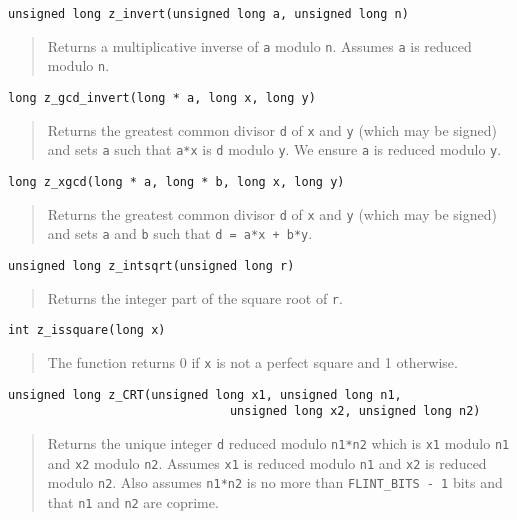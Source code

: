 \documentclass[a4paper,10pt]{article}
\newcommand{\code}{\lstinline}
\begin{document}
\begin{lstlisting}
unsigned long z_invert(unsigned long a, unsigned long n)
\end{lstlisting}
\begin{quote}
Returns a multiplicative inverse of \code{a} modulo \code{n}. Assumes \code{a} is reduced modulo \code{n}.
\end{quote}

\begin{lstlisting}
long z_gcd_invert(long * a, long x, long y)
\end{lstlisting}
\begin{quote}
Returns the greatest common divisor \code{d} of \code{x} and \code{y} (which may be signed) and sets \code{a} such that \code{a*x} is \code{d} modulo \code{y}. We ensure \code{a} is reduced modulo \code{y}.
\end{quote}

\begin{lstlisting}
long z_xgcd(long * a, long * b, long x, long y)
\end{lstlisting}
\begin{quote}
Returns the greatest common divisor \code{d} of \code{x} and \code{y} (which may be signed) and sets \code{a} and \code{b} such that \code{d = a*x + b*y}. 
\end{quote}

\begin{lstlisting}
unsigned long z_intsqrt(unsigned long r)
\end{lstlisting}
\begin{quote}
Returns the integer part of the square root of \code{r}. 
\end{quote}

\begin{lstlisting}
int z_issquare(long x)
\end{lstlisting}
\begin{quote}
The function returns 0 if \code{x} is not a perfect square and 1 otherwise. 
\end{quote}

\begin{lstlisting}
unsigned long z_CRT(unsigned long x1, unsigned long n1, 
                               unsigned long x2, unsigned long n2)
\end{lstlisting}
\begin{quote}
Returns the unique integer \code{d} reduced modulo \code{n1*n2} which is \code{x1} modulo \code{n1} and \code{x2} modulo \code{n2}. Assumes \code{x1} is reduced modulo \code{n1} and \code{x2} is reduced modulo \code{n2}. Also assumes \code{n1*n2} is no more than \code{FLINT_BITS - 1} bits and that \code{n1} and \code{n2} are coprime.
\end{quote}
\end{document}
